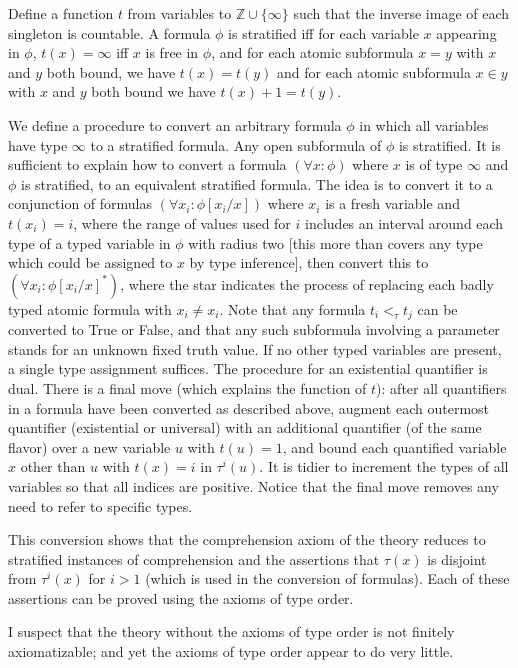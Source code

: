 \documentclass[12pt]{article}
\begin{document}
Define a function $t$ from variables to $\mathbb Z \cup \{\infty\}$ such that the inverse image of each singleton is countable.  A formula $\phi$ is stratified iff for each variable $x$ appearing in $\phi$, $t(x) = \infty$ iff $x$ is free in $\phi$, and for each atomic subformula $x=y$ with $x$ and $y$ both bound, we have $t(x)=t(y)$ and
for each atomic subformula $x \in y$ with $x$ and $y$ both bound we have $t(x)+1 =t(y)$.

We define a procedure to convert an arbitrary formula $\phi$ in which all variables have type $\infty$ to a stratified formula.  Any open subformula of $\phi$ is stratified.  It is sufficient to explain how to convert a formula $(\forall x:\phi)$ where $x$ is of type $\infty$ and $\phi$ is stratified, to an equivalent stratified formula.   The idea is to convert it
to a conjunction of formulas $(\forall x_i:\phi[x_i/x])$ where $x_i$ is a fresh variable and $t(x_i)=i$, where the range of values used for $i$ includes an interval around each type of a typed variable in $\phi$ with radius two [this more than covers any type which could be assigned to $x$ by type inference], then convert this to $(\forall x_i:\phi[x_i/x]^*)$, where the star indicates the process of replacing each
badly typed atomic formula with $x_i \neq x_i$.  Note that any formula $t_i <_\tau  t_j$ can be converted to True or False, and that any such subformula involving a parameter stands for an unknown fixed truth value.  If no other typed variables are present, a single type assignment suffices.  The procedure for an existential quantifier is dual.  There is a final move (which explains the function of $t$):  after all quantifiers in a formula have been converted as described above, augment each outermost quantifier (existential or universal) with an additional quantifier (of the same flavor) over a new variable $u$ with $t(u)=1$, and bound each quantified variable $x$ other than $u$ with $t(x)=i$ in $\tau^i(u)$.   It is tidier to increment the types of all variables so that all indices are positive.  Notice that the final move removes any need to refer to specific types.

This conversion shows that the comprehension axiom of the theory reduces to stratified instances of comprehension and the assertions that $\tau(x)$ is disjoint from $\tau^{i}(x)$ for $i>1$ (which is used in the conversion of formulas).  Each of these assertions can be proved using the axioms of type order.

I suspect that the theory without the axioms of type order is not finitely axiomatizable;  and yet the axioms of type order appear to do very little.
\end{document}
